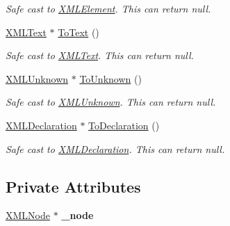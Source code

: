 \begin{DoxyCompactItemize}
\begin{DoxyCompactList}\small\item\em Safe cast to \hyperlink{classtinyxml2_1_1_x_m_l_element}{X\+M\+L\+Element}. This can return null. \end{DoxyCompactList}\item 
\hypertarget{classtinyxml2_1_1_x_m_l_handle_a6ab9e8cbfb41417246e5657e3842c62a}{}\hyperlink{classtinyxml2_1_1_x_m_l_text}{X\+M\+L\+Text} $\ast$ \hyperlink{classtinyxml2_1_1_x_m_l_handle_a6ab9e8cbfb41417246e5657e3842c62a}{To\+Text} ()\label{classtinyxml2_1_1_x_m_l_handle_a6ab9e8cbfb41417246e5657e3842c62a}

\begin{DoxyCompactList}\small\item\em Safe cast to \hyperlink{classtinyxml2_1_1_x_m_l_text}{X\+M\+L\+Text}. This can return null. \end{DoxyCompactList}\item 
\hypertarget{classtinyxml2_1_1_x_m_l_handle_aa387368a1ad8d843a9f12df863d298de}{}\hyperlink{classtinyxml2_1_1_x_m_l_unknown}{X\+M\+L\+Unknown} $\ast$ \hyperlink{classtinyxml2_1_1_x_m_l_handle_aa387368a1ad8d843a9f12df863d298de}{To\+Unknown} ()\label{classtinyxml2_1_1_x_m_l_handle_aa387368a1ad8d843a9f12df863d298de}

\begin{DoxyCompactList}\small\item\em Safe cast to \hyperlink{classtinyxml2_1_1_x_m_l_unknown}{X\+M\+L\+Unknown}. This can return null. \end{DoxyCompactList}\item 
\hypertarget{classtinyxml2_1_1_x_m_l_handle_a108858be7ee3eb53f73b5194c1aa8ff0}{}\hyperlink{classtinyxml2_1_1_x_m_l_declaration}{X\+M\+L\+Declaration} $\ast$ \hyperlink{classtinyxml2_1_1_x_m_l_handle_a108858be7ee3eb53f73b5194c1aa8ff0}{To\+Declaration} ()\label{classtinyxml2_1_1_x_m_l_handle_a108858be7ee3eb53f73b5194c1aa8ff0}

\begin{DoxyCompactList}\small\item\em Safe cast to \hyperlink{classtinyxml2_1_1_x_m_l_declaration}{X\+M\+L\+Declaration}. This can return null. \end{DoxyCompactList}\end{DoxyCompactItemize}
\subsection*{Private Attributes}
\begin{DoxyCompactItemize}
\item 
\hypertarget{classtinyxml2_1_1_x_m_l_handle_a65449d71b75d8aeb40a54224c954c138}{}\hyperlink{classtinyxml2_1_1_x_m_l_node}{X\+M\+L\+Node} $\ast$ {\bfseries \+\_\+node}\label{classtinyxml2_1_1_x_m_l_handle_a65449d71b75d8aeb40a54224c954c138}

\end{DoxyCompactItemize}


